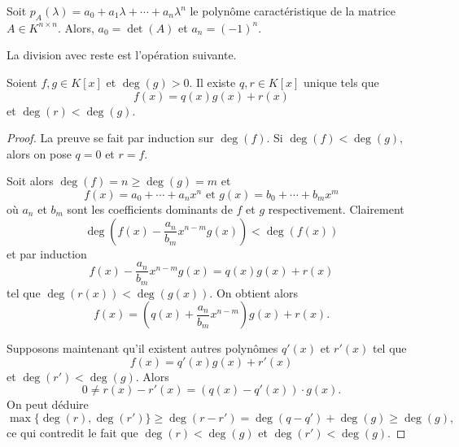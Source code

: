 \begin{lemma}
  \label{lem:22}
Soit $p_A(λ) = a_0 + a_1 λ + \cdots + a_n λ^n$ le polynôme caractéristique de la matrice $A ∈ K^{n ×n}$. Alors, $a_0 = \det(A)$ et $a_n = (-1)^n$.
\end{lemma}


La division avec reste est l'opération suivante. 

\begin{theorem}
  \label{thr:33}
  Soient $f,g \in K[x]$ et $\deg(g) >0$. Il existe $q,r \in K[x]$ unique  tels que 
  \begin{displaymath}
    f(x) = q(x) g(x) + r(x) 
  \end{displaymath}
  et $\deg(r) < \deg(g)$. 
\end{theorem}


\begin{proof}
  La preuve se fait par induction sur $\deg(f)$. Si $\deg(f) < \deg(g)$, alors on pose $q = 0$ et $r = f$.

Soit alors $\deg(f) = n \geq \deg(g)=m$ et 
\begin{displaymath}
  f(x) = a_0+ \cdots +a_n x^n \text{ et } g(x) = b_0 + \cdots + b_m x^m 
\end{displaymath}
où $a_n$ et $b_m$ sont les coefficients dominants de $f$ et $g$ respectivement. 
Clairement 
\begin{displaymath}
  \deg\left( f(x) - \frac{a_n}{ b_m } x^{n-m} g(x) \right) < \deg(f(x))
\end{displaymath}
et par induction 
\begin{displaymath}
  f(x) - \frac{a_n}{ b_m } x^{n-m} g(x)  = q(x) g(x) + r(x) 
\end{displaymath}
tel que $\deg(r(x)) < \deg(g(x))$. On  obtient alors
\begin{displaymath}
  f(x) = \left(q(x) + \frac{a_n}{ b_m } x^{n-m} \right) g(x) + r(x). 
\end{displaymath}

Supposons maintenant qu'il existent autres polynômes $q'(x)$ et $r'(x)$ tel que 
\begin{displaymath}
    f(x) = q'(x) g(x) + r'(x) 
  \end{displaymath}
  et $\deg(r') < \deg(g)$. 
Alors 
\begin{displaymath}
0 \neq   r(x) - r'(x) = (q(x) - q'(x)) ⋅ g(x). 
\end{displaymath}
On peut déduire 
\begin{displaymath}
\max\{\deg(r),\deg(r')\} \geq   \deg( r - r')  = \deg(q - q') + \deg(g) \geq \deg(g), 
\end{displaymath}
ce qui contredit le fait que $\deg(r) < \deg(g)$ et $\deg(r') < \deg(g)$. 
\end{proof}



